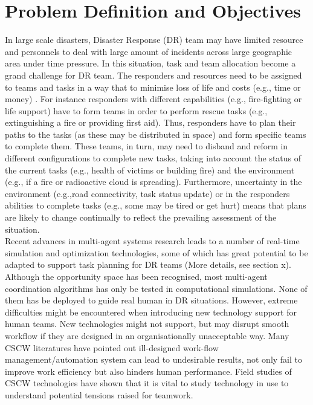 \section{Problem Definition and Objectives}
In large scale disasters, Disaster Response (DR) team may have limited resource and personnels to deal with large amount of incidents across large geographic area under time pressure. In this situation, task and team allocation become a grand challenge for DR team. The responders and resources need to be assigned to teams and tasks in a way that to minimise loss of life and costs (e.g., time or money) . For instance responders with different capabilities (e.g., fire-fighting or life support) have to form teams in order to perform rescue tasks (e.g., extinguishing a fire or providing first aid). Thus, responders have to plan their paths to the tasks (as these may be distributed in space) and form specific teams to complete them. These teams, in turn, may need to disband and reform in different configurations to complete new tasks, taking into account the status of the current tasks (e.g., health of victims or building fire) and the environment (e.g., if a fire or radioactive cloud is spreading). Furthermore, uncertainty in the environment (e.g.,road connectivity, task status update) or in the responders abilities to complete tasks (e.g., some may be tired or get hurt) means that plans are likely to change continually to reflect the prevailing assessment of the situation.\\

Recent advances in multi-agent systems research leads to a number of real-time simulation and optimization technologies, some of which has great potential to be adapted to support task planning for DR teams (More details, see section x). Although the opportunity space has been recognised, most multi-agent coordination algorithms has only be tested in computational simulations. None of them has be deployed to guide real human in DR situations. However, extreme difficulties might be encountered when introducing new technology support for human teams. New technologies might not support, but may disrupt smooth workflow if they are designed in an organisationally unacceptable way. Many CSCW literatures have pointed out ill-designed work-flow management/automation system can lead to undesirable results, not only fail to improve work efficiency but also hinders human performance. Field studies of CSCW technologies have shown that it is vital to study technology in use to understand potential tensions raised for teamwork.  \\

